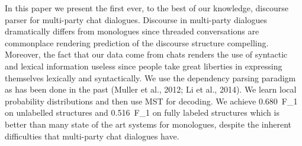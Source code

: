 In this paper we present the first ever, to the best of our knowledge, discourse parser for multi-party chat dialogues. Discourse in multi-party dialogues dramatically differs from monologues since threaded conversations are commonplace rendering prediction of the discourse structure compelling. Moreover, the fact that our data come from chats renders the use of syntactic and lexical information useless since people take great liberties in expressing themselves lexically and syntactically. We use the dependency parsing paradigm as has been done in the past (Muller et al., 2012; Li et al., 2014). We learn local probability distributions and then use MST for decoding. We achieve 0.680\ F\_1 on unlabelled structures and 0.516\ F\_1 on fully labeled structures which is better than many state of the art systems for monologues, despite the inherent difficulties that multi-party chat dialogues have.
